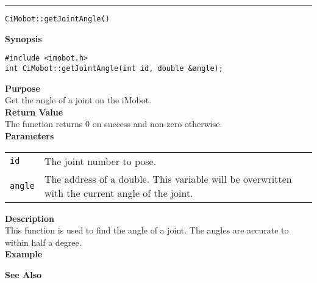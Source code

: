 \noindent
\vspace{5pt}
\rule{6.5in}{0.015in}
\noindent
{\LARGE \texttt{CiMobot::getJointAngle()}}\\
{}

\noindent
{\bf Synopsis}\\
\begin{verbatim}
#include <imobot.h>
int CiMobot::getJointAngle(int id, double &angle);
\end{verbatim}

\noindent
{\bf Purpose}\\
Get the angle of a joint on the iMobot.\\

\noindent
{\bf Return Value}\\
The function returns 0 on success and non-zero otherwise.\\

\noindent
{\bf Parameters}
\vspace{-0.1in}
\begin{description}
\item               
\begin{tabular}{p{10 mm}p{145 mm}}
\texttt{id} & The joint number to pose. \\
\texttt{angle} & The address of a double. This variable will be overwritten
with the current angle of the joint.
\end{tabular}
\end{description}

\noindent
{\bf Description}\\
This function is used to find the angle of a joint. The angles are accurate to
within half a degree. \\

\noindent
{\bf Example}\\
\noindent

\noindent
{\bf See Also}\\

